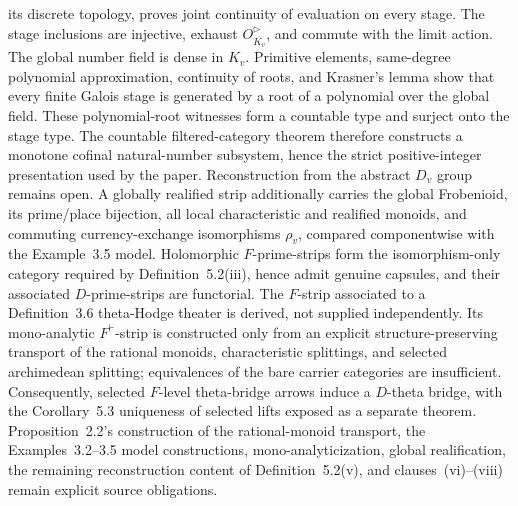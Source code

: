 \begin{definition}
  its discrete topology, proves joint continuity of evaluation on every
  stage.  The stage inclusions are injective, exhaust
  \(O_{\overline{K_v}}^\triangleright\), and commute with the limit action.
  The global number field is dense in \(K_v\).  Primitive elements,
  same-degree polynomial approximation, continuity of roots, and Krasner's
  lemma show that every finite Galois stage is generated by a root of a
  polynomial over the global field.  These polynomial-root witnesses form a
  countable type and surject onto the stage type.  The countable
  filtered-category theorem therefore constructs a monotone cofinal
  natural-number subsystem, hence the strict positive-integer presentation
  used by the paper.  Reconstruction from the abstract \(D_v\) group remains
  open.
  A globally realified strip additionally carries the global Frobenioid,
  its prime/place bijection, all local characteristic and realified monoids,
  and commuting currency-exchange isomorphisms \(\rho_v\), compared
  componentwise with the Example~3.5 model.
  Holomorphic \(F\)-prime-strips form the isomorphism-only category required
  by Definition~5.2(iii), hence admit genuine capsules, and their associated
  \(D\)-prime-strips are functorial.  The \(F\)-strip associated to a
  Definition~3.6 theta-Hodge theater is derived, not supplied independently.
  Its mono-analytic \(F^\vdash\)-strip is constructed only from an explicit
  structure-preserving transport of the rational monoids, characteristic
  splittings, and selected archimedean splitting; equivalences of the bare
  carrier categories are insufficient.
  Consequently, selected \(F\)-level theta-bridge arrows induce a
  \(D\)-theta bridge, with the Corollary~5.3 uniqueness of selected lifts
  exposed as a separate theorem.  Proposition~2.2's construction of the
  rational-monoid transport, the Examples~3.2--3.5 model constructions,
  mono-analyticization, global realification, the remaining reconstruction
  content of Definition~5.2(v), and clauses~(vi)--(viii) remain explicit
  source obligations.
\end{definition}

